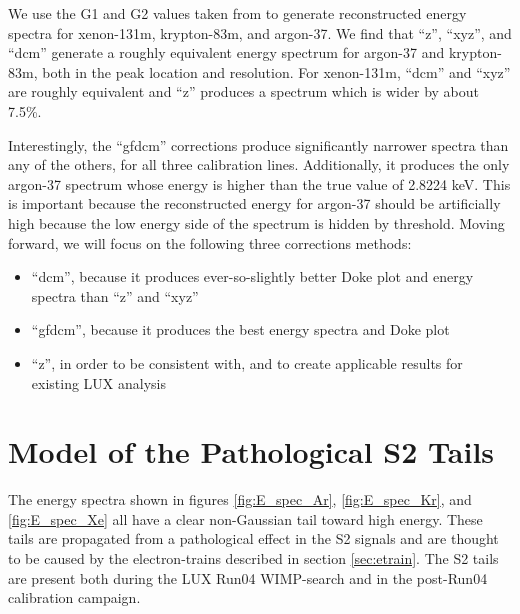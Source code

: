We use the G1 and G2 values taken from to generate reconstructed energy spectra for xenon-131m, krypton-83m, and argon-37. We find that ``z'', ``xyz'', and ``dcm'' generate a roughly equivalent energy spectrum for argon-37 and krypton-83m, both in the peak location and resolution. For xenon-131m, ``dcm'' and ``xyz'' are roughly equivalent and ``z'' produces a spectrum which is wider by about 7.5\%. 

Interestingly, the ``gfdcm'' corrections produce significantly narrower spectra than any of the others, for all three calibration lines. Additionally, it produces the only argon-37 spectrum whose energy is higher than the true value of 2.8224 keV. This is important because the reconstructed energy for argon-37 should be artificially high because the low energy side of the spectrum is hidden by threshold. Moving forward, we will focus on the following three corrections methods: 
\begin{itemize}
\item ``dcm'', because it produces ever-so-slightly better Doke plot and energy spectra than ``z'' and ``xyz''
\item ``gfdcm'', because it produces the best energy spectra and Doke plot
\item ``z'', in order to be consistent with, and to create applicable results for existing LUX analysis
\end{itemize}



\section{Model of the Pathological S2 Tails}
The energy spectra shown in figures \ref{fig:E_spec_Ar}, \ref{fig:E_spec_Kr}, and \ref{fig:E_spec_Xe} all have a clear non-Gaussian tail toward high energy. These tails are propagated from a pathological effect in the S2 signals and are thought to be caused by the electron-trains described in section \ref{sec:etrain}. The S2 tails are present both during the LUX Run04 WIMP-search and in the post-Run04 calibration campaign. 

